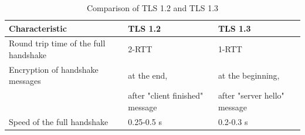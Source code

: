 \begin{table}[H]
	\centering
		\begin{tabular}{lll} \toprule
			\textbf{Characteristic} & \textbf{TLS 1.2} & \textbf{TLS 1.3} \\ \midrule
			Round trip time of the full handshake & 2-RTT & 1-RTT \\ \midrule
			Encryption of handshake messages& at the end, & at the beginning, \\ 
			& after "client finished" message & after "server hello" message \\ \midrule
			Speed of the full handshake & 0.25-0.5 s & 0.2-0.3 s\\ \midrule
		\end{tabular}
	\caption{Comparison of TLS 1.2 and TLS 1.3}
	\label{tab:comparison}
\end{table}

